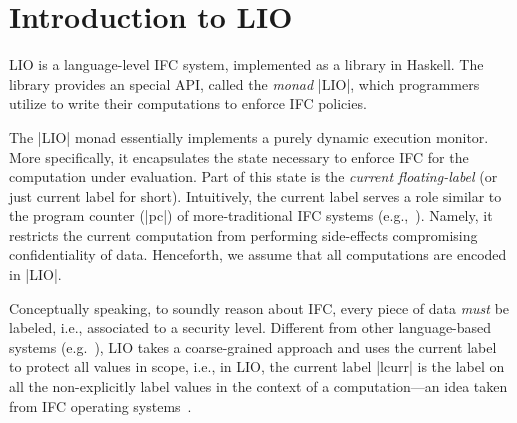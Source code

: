 \section{Introduction to LIO}
\label{sec:background}

LIO is a language-level IFC system, implemented as a library in Haskell.  The
library provides an special API, called the \emph{monad} |LIO|, which 
programmers utilize to write their computations to enforce IFC policies. 
%
%
%

The |LIO| monad essentially implements a purely dynamic execution monitor. More 
specifically, it encapsulates the state necessary to enforce IFC for the computation
under evaluation.
%
Part of this state is the \emph{current floating-label} (or just current label for short).
%
Intuitively, the current label serves a role similar to the program
counter (|pc|) of more-traditional IFC systems
(e.g.,~\cite{FlowCaml}).
%
Namely, it restricts the current computation from performing 
side-effects compromising confidentiality of data.
Henceforth, we assume that all computations are encoded in |LIO|.

%
%

Conceptually speaking, to soundly reason about IFC, every piece of data 
 \emph{must} be labeled, i.e., associated to a security level.
%
%
%
%
 Different from other language-based systems (e.g.~\cite{myers:jif,FlowCaml}),
 LIO takes a coarse-grained approach and uses the current label to protect all
 values in scope, i.e., in LIO, the current label |lcurr| is the label on all
 the non-explicitly label values in the context of a computation---an idea taken
 from IFC operating systems~\cite{efstathopoulos:asbestos,zeldovich:histar}.
%
%

